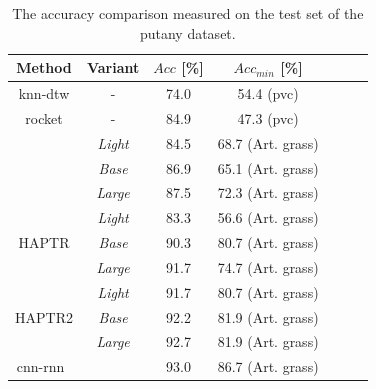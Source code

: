 \documentclass[a4paper, 10pt, twoside]{report}
\begin{document}
\begin{table}[htbp!]
\centering

\caption{ The accuracy comparison measured on the test set of the \acrshort{putany} dataset.}

\begin{tabular}{ccccccc}
\hline
Method                 & Variant  & $Acc$ [\%] & $Acc_{min}$ [\%] \\ \hline
\acrshort{knn}-\acrshort{dtw}                & -       & 74.0 & 54.4 (\acrshort{pvc}) \\ 
\acrshort{rocket}                 & -       & 84.9 & 47.3 (\acrshort{pvc}) \\ \hline{}
\multirow{3}{*}{\acrshort{tcn}}   & \textit{Light}     & 84.5 & 68.7 (Art. grass)\\
                       & \textit{Base}      & 86.9 & 65.1 (Art. grass)\\
                       & \textit{Large}     & 87.5 & 72.3 (Art. grass)\\ \hline
\multirow{3}{*}{HAPTR} & \textit{Light}     & 83.3 & 56.6 (Art. grass)\\
                       & \textit{Base}      & 90.3 & 80.7 (Art. grass)\\
                       & \textit{Large}     & 91.7 & 74.7 (Art. grass)\\ \hline
\multirow{3}{*}{HAPTR2} & \textit{Light}   & 91.7 & 80.7 (Art. grass)\\
                       & \textit{Base}      & 92.2 & 81.9 (Art. grass)\\
                       & \textit{Large}     & 92.7 & 81.9 (Art. grass)\\ \hline
\acrshort{cnn}-\acrshort{rnn}~\cite{KubaRNN}             &        & 93.0 & 86.7 (Art. grass)\\ \hline                      

\end{tabular}
\label{tab:dl_results}
\end{table}
\end{document}
